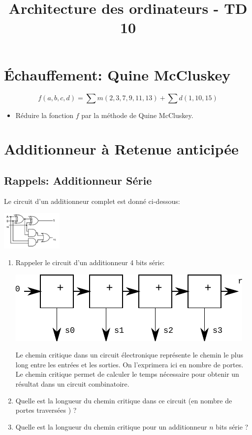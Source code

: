 \documentclass[a4paper,10pt]{exam}
\title{Architecture des ordinateurs - TD 10}
\author{}
\date{}
\begin{document}
\maketitle

\section{Échauffement: Quine McCluskey}
$$ f(a,b,c,d) = \sum m(2,3,7,9,11,13) + \sum d(1,10,15) $$
\begin{itemize}
  \item Réduire la fonction $f$ par la méthode de Quine McCluskey.
\end{itemize}

\section{Additionneur à Retenue anticipée}

\subsection{Rappels: Additionneur Série}

Le circuit d'un additionneur complet est donné ci-dessous:

\includegraphics[width=3cm]{TD10-Fadd}

\begin{enumerate}
  \item Rappeler le circuit d'un additionneur 4 bits série:
    \begin{solution}
    \includegraphics{TD10-Sadd4}
    \end{solution}


    Le chemin critique dans un circuit électronique représente le chemin
    le plus long entre les entrées et les sorties. On l'exprimera ici en
    nombre de portes. Le chemin critique permet de calculer le temps nécessaire
    pour obtenir un résultat dans un circuit combinatoire.

  \item Quelle est la longueur du chemin critique dans ce circuit (en nombre de
    portes traversées ) ?
  \item Quelle est la longueur du chemin critique pour un additionneur $n$ bits
    série ?
\end{enumerate}
\end{document}

